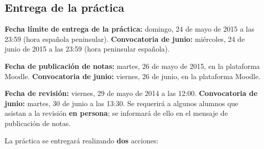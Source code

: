 \subsection{Entrega de la práctica}

\textbf{Fecha límite de entrega de la práctica:} domingo, 24 de mayo de 2015 a las 23:59 (hora española peninsular). {\bf Convocatoria de junio:} miércoles, 24 de junio de 2015 a las 23:59 (hora peninsular española).

\textbf{Fecha de publicación de notas:} martes, 26 de mayo de 2015, en la plataforma Moodle.
{\bf Convocatoria de junio:} viernes, 26 de junio, en la plataforma Moodle.

\textbf{Fecha de revisión:} viernes, 29 de mayo de 2014 a las 12:00. {\bf Convocatoria de junio:} martes, 30 de junio a las 13:30. Se requerirá a algunos alumnos que asistan a la revisión {\bf en persona}; se informará de ello en el mensaje de publicación de notas.

La práctica se entregará realizando {\bf dos} acciones:

